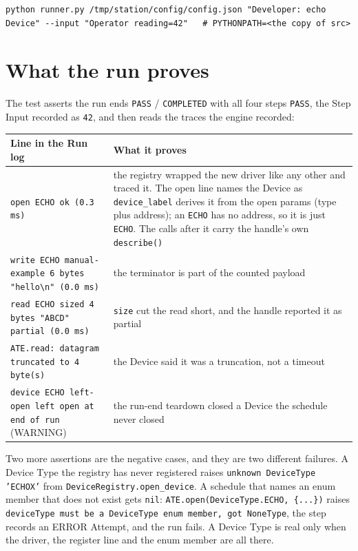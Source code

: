 \begin{lstlisting}[language=ATEShell]
python runner.py /tmp/station/config/config.json "Developer: echo Device" --input "Operator reading=42"   # PYTHONPATH=<the copy of src>
\end{lstlisting}

\section{What the run proves}

The test asserts the run ends \texttt{PASS} / \texttt{COMPLETED} with all four steps
\texttt{PASS}, the Step Input recorded as \texttt{42}, and then reads the traces the engine
recorded:

\begingroup\small
\begin{longtable}{p{5.4cm} p{7.6cm}}
\toprule
\textbf{Line in the Run log} & \textbf{What it proves} \\
\midrule
\endhead
\texttt{open ECHO ok (0.3 ms)} & the registry wrapped the new driver like any other and traced it.
  The open line names the Device as \texttt{device\_\allowbreak label} derives it from the open
  params (type plus address); an \texttt{ECHO} has no address, so it is just \texttt{ECHO}. The calls
  after it carry the handle's own \texttt{describe()} \\
\texttt{write ECHO manual-example 6 bytes "hello\textbackslash n" (0.0 ms)} & the terminator is part
  of the counted payload \\
\texttt{read ECHO sized 4 bytes "ABCD" partial (0.0 ms)} & \texttt{size} cut the read short, and the
  handle reported it as partial \\
\texttt{ATE.read: datagram truncated to 4 byte(s)} & the Device said it was a truncation, not a
  timeout \\
\texttt{device ECHO left-open left open at end of run} (WARNING) & the run-end teardown closed a
  Device the schedule never closed \\
\bottomrule
\end{longtable}
\endgroup

Two more assertions are the negative cases, and they are two different failures. A Device Type the
registry has never registered raises \texttt{unknown DeviceType 'ECHOX'} from
\texttt{DeviceRegistry.open\_\allowbreak device}. A schedule that names an enum member that does not
exist gets \texttt{nil}: \texttt{ATE.open(DeviceType.ECHO, \{...\})} raises \texttt{deviceType must be
a DeviceType enum member, got NoneType}, the step records an ERROR Attempt, and the run fails. A
Device Type is real only when the driver, the register line and the enum member are all there.

